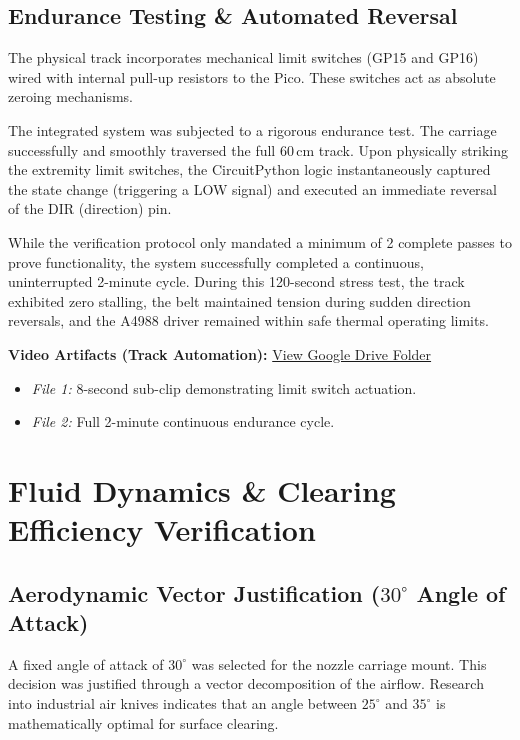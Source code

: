 \documentclass{article}
\begin{document}
\subsection{Endurance Testing \& Automated Reversal}
The physical track incorporates mechanical limit switches (GP15 and GP16) wired with internal pull-up resistors to the Pico. These switches act as absolute zeroing mechanisms. 

The integrated system was subjected to a rigorous endurance test. The carriage successfully and smoothly traversed the full 60\,cm track. Upon physically striking the extremity limit switches, the CircuitPython logic instantaneously captured the state change (triggering a LOW signal) and executed an immediate reversal of the DIR (direction) pin. 

While the verification protocol only mandated a minimum of 2 complete passes to prove functionality, the system successfully completed a continuous, uninterrupted 2-minute cycle. During this 120-second stress test, the track exhibited zero stalling, the belt maintained tension during sudden direction reversals, and the A4988 driver remained within safe thermal operating limits.

\vspace{0.5cm}
\noindent
\textbf{Video Artifacts (Track Automation):} \href{https://drive.google.com/drive/folders/1wNK_jYUvHXoMne_cIdYbAIURdvYpuG-J?usp=sharing}{View Google Drive Folder}
\begin{itemize}
    \item \textit{File 1:} 8-second sub-clip demonstrating limit switch actuation.
    \item \textit{File 2:} Full 2-minute continuous endurance cycle.
\end{itemize}

\section{Fluid Dynamics \& Clearing Efficiency Verification}
\subsection{Aerodynamic Vector Justification ($30^\circ$ Angle of Attack)}
A fixed angle of attack of $30^\circ$ was selected for the nozzle carriage mount. This decision was justified through a vector decomposition of the airflow. Research into industrial air knives indicates that an angle between $25^\circ$ and $35^\circ$ is mathematically optimal for surface clearing. 
\end{document}
